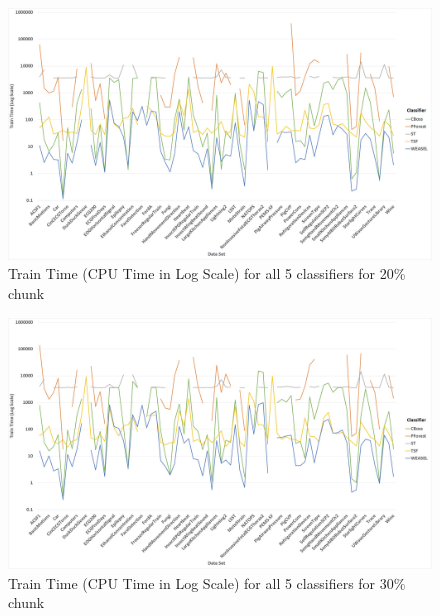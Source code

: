   \begin{figure} [!htb]
    \centering
    \includegraphics[width=\textwidth]{./Chapters/06 Results/Duration_20pct.jpg}
    \caption{Train Time (CPU Time in Log Scale) for all 5 classifiers for 20\% chunk}
    \label{fig:Duration20Line}
  \end{figure}
  
  \begin{figure} [!htb]
    \centering
    \includegraphics[width=\textwidth]{./Chapters/06 Results/Duration_30pct.jpg}
    \caption{Train Time (CPU Time in Log Scale) for all 5 classifiers for 30\% chunk}
    \label{fig:Duration30Line}
  \end{figure}
  

